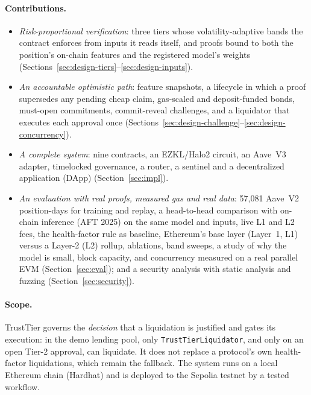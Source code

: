 \documentclass[sigconf,nonacm]{acmart}
\newcommand{\code}[1]{\texttt{\smaller #1}}
\begin{document}
\paragraph{Contributions.}
\begin{itemize}
  \item \emph{Risk-proportional verification}: three tiers whose volatility-adaptive bands the contract enforces from inputs it reads itself, and proofs bound to both the position's on-chain features and the registered model's weights (Sections~\ref{sec:design-tiers}--\ref{sec:design-inputs}).
  \item \emph{An accountable optimistic path}: feature snapshots, a lifecycle in which a proof supersedes any pending cheap claim, gas-scaled and deposit-funded bonds, must-open commitments, commit-reveal challenges, and a liquidator that executes each approval once (Sections~\ref{sec:design-challenge}--\ref{sec:design-concurrency}).
  \item \emph{A complete system}: nine contracts, an EZKL/Halo2 circuit, an Aave~V3 adapter, timelocked governance, a router, a sentinel and a decentralized application (DApp) (Section~\ref{sec:impl}).
  \item \emph{An evaluation with real proofs, measured gas and real data}: 57,081 Aave~V2 position-days for training and replay, a head-to-head comparison with on-chain inference (AFT 2025) on the same model and inputs, live L1 and L2 fees, the health-factor rule as baseline, Ethereum's base layer (Layer~1, L1) versus a Layer-2 (L2) rollup, ablations, band sweeps, a study of why the model is small, block capacity, and concurrency measured on a real parallel EVM (Section~\ref{sec:eval}); and a security analysis with static analysis and fuzzing (Section~\ref{sec:security}).
\end{itemize}

\paragraph{Scope.} TrustTier governs the \emph{decision} that a liquidation is justified and gates its execution: in the demo lending pool, only \code{TrustTierLiquidator}, and only on an open Tier-2 approval, can liquidate. It does not replace a protocol's own health-factor liquidations, which remain the fallback. The system runs on a local Ethereum chain (Hardhat) and is deployed to the Sepolia testnet by a tested workflow.

\end{document}
